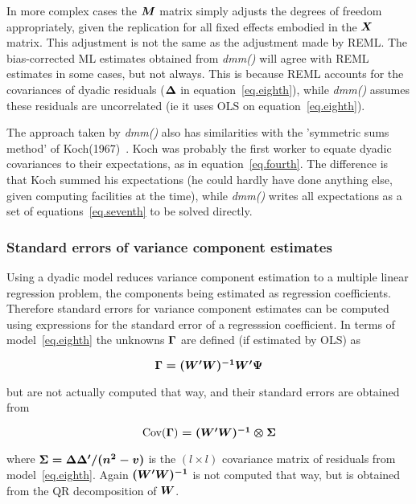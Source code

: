 \documentclass[titlepage]{article}  %
\begin{document}
In more complex cases the $\mbox{\boldmath $M$}$ matrix simply adjusts the degrees of freedom appropriately, given the replication for all fixed effects embodied in the $\mbox{\boldmath $X$}$ matrix. This adjustment is not the same as the adjustment made by REML. The bias-corrected ML estimates obtained from {\em dmm()} will agree with REML estimates in some cases, but not always. This is because REML accounts for the covariances of dyadic residuals ($\mbox{\boldmath $\Delta$}$ in equation~\ref{eq.eighth}), while {\em dmm()} assumes these residuals are uncorrelated (ie it uses OLS on equation~\ref{eq.eighth}).

 The approach taken by {\em dmm()} also has similarities with the 'symmetric sums method' of Koch(1967)~\cite{koch:67}. Koch was probably the first worker to equate dyadic covariances to their expectations, as in equation~\ref{eq.fourth}. The difference is that Koch summed his expectations (he could hardly have done anything else, given computing facilities at the time), while {\em dmm()} writes all expectations as a set of equations~\ref{eq.seventh} to be solved directly.

\subsubsection{Standard errors of variance component estimates}
Using a dyadic model reduces variance component estimation to a multiple linear regression problem, the components being estimated as regression coefficients. Therefore standard errors for variance component estimates can be computed using expressions for the standard error of a regresssion coefficient. In terms of model~\ref{eq.eighth} the unknowns $\mbox{\boldmath $\Gamma$}$ are defined (if estimated by OLS) as

\begin{displaymath}
\mbox{\boldmath $\Gamma = (W^{\prime}W)^{-1}W^{\prime}\Psi$}
\end{displaymath}

but are not actually computed that way,
and their standard errors are obtained  from

\begin{displaymath}
\mbox{Cov(\boldmath $\Gamma$) $ = (W^{\prime}W)^{-1} \otimes \Sigma$}
\end{displaymath}

where $\mbox{\boldmath $\Sigma = \Delta \Delta^{\prime}/(n^{2}-v)$}$ is the $(l \times l)$ covariance matrix of residuals from model~\ref{eq.eighth}. Again $\mbox{\boldmath $(W^{\prime}W)^{-1}$}$ is not computed that way, but is obtained from the QR decomposition of $\mbox{\boldmath $W$}$. 
\end{document}
